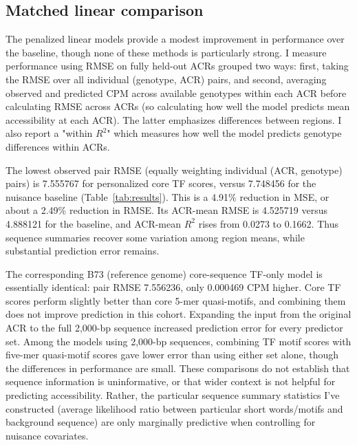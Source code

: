 \documentclass[10pt]{article}
\newcommand{\reporttablepath}{linear_results_table.tex}}{%
\newcommand{\reporttablepath}{docs/figures/linear_results_table.tex}}{%
\newcommand{\reporttablepath}{figures/linear_results_table.tex}}}
\begin{document}
\subsection{Matched linear comparison}\label{sec:linearresults}
The penalized linear models provide a modest improvement in performance over the baseline, though none of these methods is particularly strong. I measure performance using RMSE on fully held-out ACRs grouped two ways: first, taking the RMSE over all individual (genotype, ACR) pairs, and second, averaging observed and predicted CPM across available genotypes within each ACR before calculating RMSE across ACRs (so calculating how well the model predicts mean accessibility at each ACR). The latter emphasizes differences between regions.  I also report a "within $R^2$" which measures how well the model predicts genotype differences within ACRs.

\begin{table}[htbp]
\centering\small

\caption{Out-of-fold results on the identical 495,900 pairs and 9,666 ACRs. Core denotes the original ACR sequence, while full denotes the entire centered 2,000-bp window. Words denotes 5-mer quasi-motifs. RMSE is in CPM. The bold row has the lowest observed RMSE among the linear models, rather than identifying a statistically established winner.}
\label{tab:results}
\end{table}

The lowest observed pair RMSE (equally weighting individual (ACR, genotype) pairs) is 7.555767 for personalized core TF scores, versus 7.748456 for the nuisance baseline (Table~\ref{tab:results}). This is a 4.91\% reduction in MSE, or about a 2.49\% reduction in RMSE. Its ACR-mean RMSE is 4.525719 versus 4.888121 for the baseline, and ACR-mean $R^2$ rises from 0.0273 to 0.1662. Thus sequence summaries recover some variation among region means, while substantial prediction error remains.

The corresponding B73 (reference genome) core-sequence TF-only model is essentially identical: pair RMSE 7.556236, only 0.000469 CPM higher. Core TF scores perform slightly better than core 5-mer quasi-motifs, and combining them does not improve prediction in this cohort. Expanding the input from the original ACR to the full 2,000-bp sequence increased prediction error for every predictor set. Among the models using 2,000-bp sequences, combining TF motif scores with five-mer quasi-motif scores gave lower error than using either set alone, though the differences in performance are small. These comparisons do not establish that sequence information is uninformative, or that wider context is not helpful for predicting accessibility. Rather, the particular sequence summary statistics I've constructed (average likelihood ratio between particular short words/motifs and background sequence) are only marginally predictive when controlling for nuisance covariates. 
\end{document}
